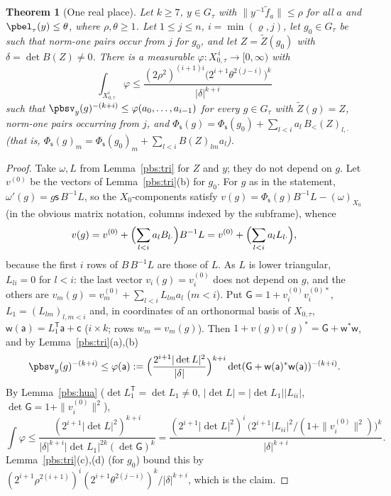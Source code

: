 \documentclass[10pt]{amsart}
\newtheorem{theorem}{Theorem}[section]
\theoremstyle{definition}
\theoremstyle{remark}
\begin{document}
\begin{theorem}[One real place]\label{pbs:oneplace}
Let $k\ge7$, $y\in G_\tau$ with $\|y^{-1}\tilde f_a\|\le\rho$ for all $a$ and $\pbel_\tau(y)\le\theta$,
where $\rho,\theta\ge1$. Let $1\le j\le n$, $i=\min(\varrho,j)$, let $g_0\in G_\tau$ be such that
norm-one pairs occur from $j$ for $g_0$, and let $Z=\tilde Z(g_0)$ with $\delta=\det B(Z)\ne0$. There is
a measurable $\varphi\colon X_{0,\tau}^{\,i}\to[0,\infty)$ with
\[
\int_{X_{0,\tau}^i}\varphi\le\frac{(2\rho^2)^{(i+1)i}\bigl(2^{i+1}\theta^{2(j-i)}\bigr)^k}{|\delta|^{k+i}}
\]
such that $\pbsv_y(g)^{-(k+i)}\le\varphi(a_0,\dots,a_{i-1})$ for every $g\in G_\tau$ with $\tilde
Z(g)=Z$, norm-one pairs occurring from $j$, and $\Phi_{\mathsf s}(g)=\Phi_{\mathsf s}(g_0)+\sum_{l<i}a_l
\,B_<(Z)_{l,\cdot}$ (that is, $\Phi_{\mathsf s}(g)_m=\Phi_{\mathsf s}(g_0)_m+\sum_{l<i}B(Z)_{lm}a_l$).
\end{theorem}
\begin{proof}
Take $\omega,L$ from Lemma~\ref{pbs:tri} for $Z$ and $y$; they do not depend on $g$. Let $v^{(0)}$ be
the vectors of Lemma~\ref{pbs:tri}(b) for $g_0$. For $g$ as in the statement, $\omega'(g)=g\mathsf s\,
B^{-1}L$, so the $X_0$-components satisfy $v(g)=\Phi_{\mathsf s}(g)B^{-1}L-(\omega)_{X_0}$ (in the
obvious matrix notation, columns indexed by the subframe), whence
\[
v(g)=v^{(0)}+\Bigl(\sum_{l<i}a_lB_{l\cdot}\Bigr)B^{-1}L=v^{(0)}+\Bigl(\sum_{l<i}a_lL_{l\cdot}\Bigr),
\]
because the first $i$ rows of $B\,B^{-1}L$ are those of $L$. As $L$ is lower triangular, $L_{li}=0$ for
$l<i$: the last vector $v_i(g)=v^{(0)}_i$ does not depend on $g$, and the others are $v_m(g)=v^{(0)}_m+
\sum_{l<i}L_{lm}a_l$ ($m<i$). Put $\mathsf G=1+v^{(0)}_iv^{(0)*}_i$, $L_1=(L_{lm})_{l,m<i}$ and, in
coordinates of an orthonormal basis of $X_{0,\tau}$, $\mathsf w(\mathsf a)=L_1^{\mathsf T}\mathsf a+
\mathsf c$ ($i\times k$; rows $w_m=v_m(g)$). Then $1+v(g)v(g)^*=\mathsf G+\mathsf w^*\mathsf w$, and by
Lemma~\ref{pbs:tri}(a),(b)
\[
\pbsv_y(g)^{-(k+i)}\le\varphi(\mathsf a):=\Bigl(\frac{2^{i+1}|\det L|^2}{|\delta|}\Bigr)^{k+i}\det(\mathsf
G+\mathsf w(\mathsf a)^*\mathsf w(\mathsf a))^{-(k+i)} .
\]
By Lemma~\ref{pbs:hua} ($\det L_1^{\mathsf T}=\det L_1\ne0$, $|\det L|=|\det L_1||L_{ii}|$, $\det\mathsf G=1+
\|v^{(0)}_i\|^2$),
\[
\int\varphi\le\frac{(2^{i+1}|\det L|^2)^{k+i}}{|\delta|^{k+i}|\det L_1|^{2k}(\det\mathsf G)^k}=\frac{(2^{i+1}
|\det L|^2)^i\,\bigl(2^{i+1}|L_{ii}|^2/(1+\|v^{(0)}_i\|^2)\bigr)^k}{|\delta|^{k+i}}.
\]
Lemma~\ref{pbs:tri}(c),(d) (for $g_0$) bound this by $(2^{i+1}\rho^{2(i+1)})^i(2^{i+1}\theta^{2(j-i)})^k/
|\delta|^{k+i}$, which is the claim.
\end{proof}
\end{document}
